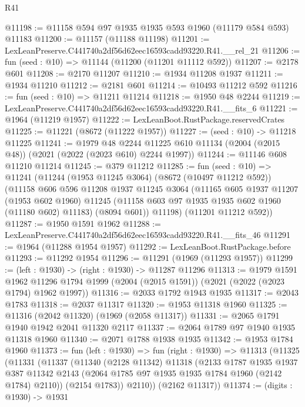 \begin{lexlean}{R41}
\begin{coremodule}
@11198 := @11158 @594 @97 @1935 @1935 @593 @1960 (@11179 @584 @593) @11183
@11200 := @11157 (@11188 @11198)
@11201 := LexLeanPreserve.C441740a2df56d62eec16593cadd93220.R41.__rel_21
@11206 := fun (seed : @10) => @11144 (@11200 (@11201 @11112 @592))
@11207 := @2178 @601
@11208 := @2170 @11207
@11210 := @1934 @11208 @1937
@11211 := @1934 @11210
@11212 := @2181 @601
@11214 := @10493 @11212 @592
@11216 := fun (seed : @10) => @11211 @11214
@11218 := @1950 @48 @2244
@11219 := LexLeanPreserve.C441740a2df56d62eec16593cadd93220.R41.__fits_6
@11221 := @1964 (@11219 @1957)
@11222 := LexLeanBoot.RustPackage.reservedCrates
@11225 := @11221 (@8672 (@11222 @1957))
@11227 := (seed : @10) -> @11218 @11225
@11241 := @1979
    @48
    @2244
    @11225
    @610
    @11134
    (@2004 (@2015 @48))
    (@2021 (@2022 (@2023 @610) @2244 @1997))
@11244 := @11146 @608 @11210 @11214
@11245 := @379 @11212
@11285 := fun (seed : @10) =>
  @11241
    (@11244
      (@1953 @11245 @3064)
      (@8672 (@10497 @11212 @592))
      (@11158
        @606
        @596
        @11208
        @1937
        @11245
        @3064
        (@11165
          @605
          @1937
          @11207
          (@1953 @602 @1960)
          @11245
          (@11158 @603 @97 @1935 @1935 @602 @1960 (@11180 @602) @11183)
          (@8094 @601))
        @11198)
      (@11201 @11212 @592))
@11287 := @1950 @1591 @1962
@11288 := LexLeanPreserve.C441740a2df56d62eec16593cadd93220.R41.__fits_46
@11291 := @1964 (@11288 @1954 @1957)
@11292 := LexLeanBoot.RustPackage.before
@11293 := @11292 @1954
@11296 := @11291 (@1969 (@11293 @1957))
@11299 := (left : @1930) -> (right : @1930) -> @11287 @11296
@11313 := @1979
    @1591
    @1962
    @11296
    @1794
    @1999
    (@2004 (@2015 @1591))
    (@2021 (@2022 (@2023 @1794) @1962 @1997))
@11316 := @2033 @1792 @1943 @1935
@11317 := @2043 @1783
@11318 := @2037 @11317
@11320 := @1953 @11318 @1960
@11325 := @11316 (@2042 @11320) (@1969 (@2058 @11317))
@11331 := @2065 @1791 @1940 @1942 @2041 @11320 @2117
@11337 := @2064 @1789 @97 @1940 @1935 @11318 @1960
@11340 := @2071 @1788 @1938 @1935
@11342 := @1953 @1784 @1960
@11373 := fun (left : @1930) =>
  fun (right : @1930) =>
  @11313
    (@11325
      (@11331
        (@11337
          (@11340
            (@2128 @11342)
            @11318
            (@2133
              @1787
              @1935
              @1937
              @387
              @11342
              @2143
              (@2064 @1785 @97 @1935 @1935 @1784 @1960 (@2142 @1784) @2110))
            (@2154 @1783))
          @2110))
      (@2162 @11317))
@11374 := (digits : @1930) -> @1931

\end{coremodule}
\end{lexlean}
